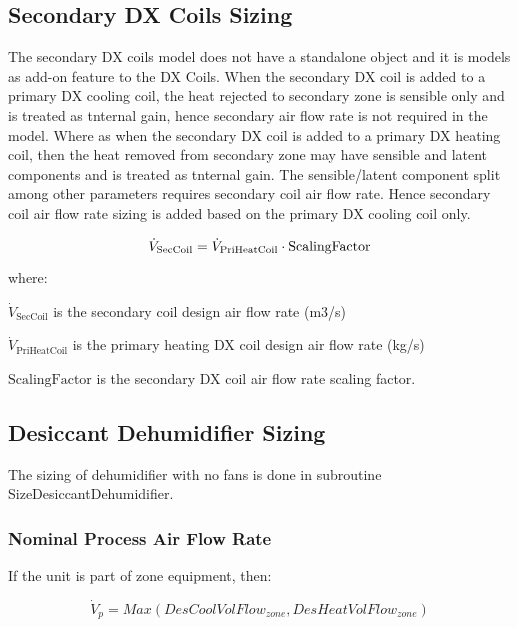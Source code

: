 \subsection{Secondary DX Coils Sizing}\label{secondary-dx-coils-sizing}

The secondary DX coils model does not have a standalone object and it is models as add-on feature to the DX Coils. When the secondary DX coil is added to a primary DX cooling coil, the heat rejected to secondary zone is sensible only and is treated as tnternal gain, hence secondary air flow rate is not required in the model. Where as when the secondary DX coil is added to a primary DX heating coil, then the heat removed from secondary zone may have sensible and latent components and is treated as tnternal gain. The sensible/latent component split among other parameters requires secondary coil air flow rate. Hence secondary coil air flow rate sizing is added based on the primary DX cooling coil only.

\begin{equation}
  \dot{V}_{\rm{SecCoil}} = \dot{V}_{\rm{PriHeatCoil}} \cdot \text{ScalingFactor}
\end{equation}

where:

\(\dot{V}_\text{SecCoil}\) is the secondary coil design air flow rate (m3/s)

\(\dot{V}_\text{PriHeatCoil}\) is the primary heating DX coil design air flow rate (kg/s)

\(\text{ScalingFactor}\) is the secondary DX coil air flow rate scaling factor.

\subsection{Desiccant Dehumidifier Sizing}\label{desiccant-dehumidifier-sizing}

The sizing of dehumidifier with no fans is done in subroutine SizeDesiccantDehumidifier.

\subsubsection{Nominal Process Air Flow Rate}\label{nominal-process-air-flow-rate}

If the unit is part of zone equipment, then:

\begin{equation}
{\dot V_p} = Max\left( {DesCoolVolFlo{w_{zone}},DesHeatVolFlo{w_{zone}}} \right)
\end{equation}

